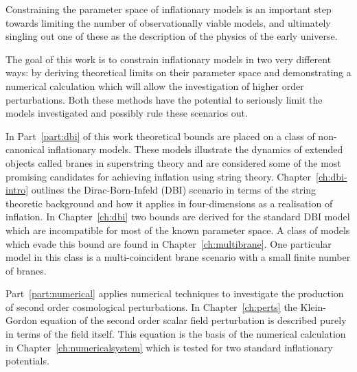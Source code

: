 Constraining the parameter space of inflationary models is an important step
towards limiting the number of observationally viable models, and ultimately
singling out one of these as the description of the physics of the early
universe. 

The goal of this work is to constrain inflationary models in two very different
ways: by deriving theoretical limits on their parameter space and demonstrating
a numerical calculation which will allow the investigation of higher order
perturbations. Both these methods have the potential to seriously limit the
models investigated and possibly rule these scenarios out.

In Part~\ref{part:dbi} of this work theoretical bounds are placed on a class of
non-canonical inflationary models. These models illustrate the dynamics of
extended objects called branes in superstring theory and are considered some of
the most promising candidates for achieving inflation using string theory.
Chapter~\ref{ch:dbi-intro} outlines the Dirac-Born-Infeld (DBI) scenario in
terms of the string theoretic background and how it applies in four-dimensions
as a realisation of inflation. In Chapter~\ref{ch:dbi} two bounds are derived
for the standard DBI model which are incompatible for most of the known
parameter space. A class of models which evade this bound are found in
Chapter~\ref{ch:multibrane}. One particular model in this class is a
multi-coincident brane scenario with a small finite number of branes.


Part~\ref{part:numerical} applies numerical techniques to investigate the
production of second order cosmological perturbations. In
Chapter~\ref{ch:perts} the Klein-Gordon equation of the second order
scalar field perturbation is described purely in terms of the field itself.
This equation is the basis of the numerical calculation in
Chapter~\ref{ch:numericalsystem} which is tested for two standard inflationary
potentials. 


